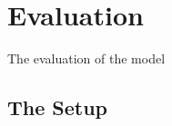 \chapter{Evaluation}
The evaluation of the model

\section{The Setup}

\begin{landscape}
\hspace*{\fill}
\noindent
\hspace*{\fill}
\\
\hspace*{\fill}

\hspace*{\fill}
\\
\hspace*{\fill}

\hspace*{\fill}
\\
\hspace*{\fill}

\hspace*{\fill}
\\
\hspace*{\fill}

\hspace*{\fill}
\\
\hspace*{\fill}

\hspace*{\fill}
\\
\hspace*{\fill}

\hspace*{\fill}
\end{landscape}

